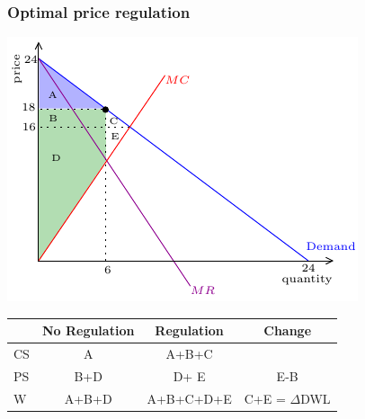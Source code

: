 \documentclass[xcolor=pdftex,dvipsnames]{beamer}
\begin{document}
\begin{frame}
  \frametitle{Optimal price regulation}
  \begin{center}
    \includegraphics{pics/OptReg1}

  {\scriptsize
    \begin{tabular}{lccc}
\hline      & No Regulation & Regulation & Change\\
\hline      CS & A&{\color{white}A+B+C} &{\color{white}{B+C}}\\
\hline      PS & B+D  & {\color{white}D+ E} &  {\color{white}E-B} \\
\hline      W & A+B+D &  {\color{white}A+B+C+D+E} &  {\color{white}C+E = $\Delta$DWL}\\\hline
    \end{tabular}
  }
  \end{center}
\end{frame}
\end{document}
